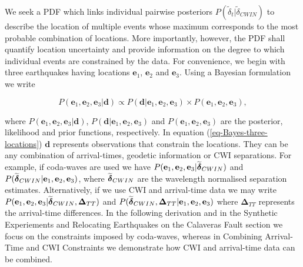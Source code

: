 \documentclass[12pt,double]{article}
\newcommand{\mitbf}[1]{  
  \hbox{\mathversion{bold}$#1$}}
\begin{document}
We seek a PDF which links
 individual pairwise posteriors $P(\widetilde{\delta}_t|\widetilde{\delta}_{CWIN})$
to describe the location of multiple events whose maximum corresponds to
 the most probable combination of locations.
More importantly, however, the PDF shall
quantify location uncertainty and provide information
on the degree to which individual events are constrained
 by the data. For convenience, we begin with three earthquakes having locations
$\mathbf{e}_1$, $\mathbf{e}_2$ and $\mathbf{e}_3$. Using a Bayesian
formulation we write
\begin{linenomath*} \begin{equation}
\label{eq-Bayes-three-locations}
P(\mathbf{e}_1, \mathbf{e}_2, \mathbf{e}_3| \mathbf{d}) \propto P( \mathbf{d}|\mathbf{e}_1, \mathbf{e}_2, \mathbf{e}_3)
\times P(\mathbf{e}_1, \mathbf{e}_2, \mathbf{e}_3),
\end{equation} \end{linenomath*}
where $P(\mathbf{e}_1, \mathbf{e}_2, \mathbf{e}_3 | \mathbf{d})$,
$P(\mathbf{d}|\mathbf{e}_1, \mathbf{e}_2, \mathbf{e}_3)$ and
$P(\mathbf{e}_1, \mathbf{e}_2, \mathbf{e}_3)$ are the posterior,
likelihood and prior functions, respectively. In equation
(\ref{eq-Bayes-three-locations}) $\mathbf{d}$ represents
observations that constrain the locations. They can be any
combination of arrival-times, geodetic information  or CWI
separations. For example, if coda-waves are used we have
$P(\mathbf{e}_1, \mathbf{e}_2, \mathbf{e}_3 |
\widetilde{\mitbf{\delta}}_{CWIN})$ and
$P(\widetilde{\mitbf{\delta}}_{CWIN}|\mathbf{e}_1, \mathbf{e}_2,
\mathbf{e}_3)$, where $\widetilde{\mitbf{\delta}}_{CWIN}$ are the
wavelength normalised separation estimates. Alternatively, if we use
CWI and arrival-time data we may write $P(\mathbf{e}_1, \mathbf{e}_2,
\mathbf{e}_3 | \widetilde{\mitbf{\delta}}_{CWIN},
\mathbf{\Delta}_{TT})$ and
$P(\widetilde{\mitbf{\delta}}_{CWIN},\mathbf{\Delta}_{TT}|\mathbf{e}_1,
\mathbf{e}_2, \mathbf{e}_3)$ where $\mathbf{\Delta}_{TT}$ represents
the arrival-time differences. In the following derivation and in 
the Synthetic Experiements and Relocating Earthquakes on the Calaveras Fault section we focus
on the constraints imposed by coda-waves, whereas in 
Combining Arrival-Time and CWI Constraints we demonstrate how CWI and arrival-time data can be combined.
\end{document}
